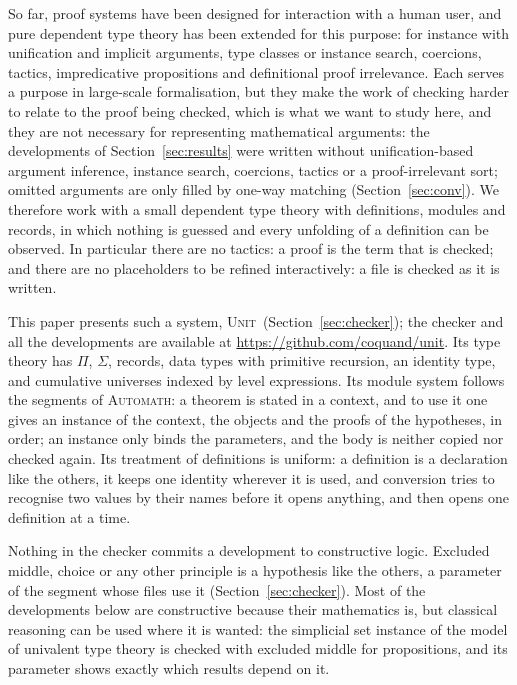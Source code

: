 \documentclass[11pt]{article}
\newcommand{\sys}{\textsc{Unit}}
\begin{document}
So far, proof systems have been designed for interaction with a human
user, and pure dependent type theory has been extended for this purpose:
for instance with unification and implicit arguments, type classes
or instance search, coercions, tactics, impredicative propositions and
definitional proof irrelevance. Each serves a purpose in large-scale
formalisation, but they make the work of checking harder to relate to
the proof being checked, which is what we want to study here, and they
are not necessary for representing mathematical arguments: the
developments of Section~\ref{sec:results} were written without
unification-based argument inference, instance search, coercions,
tactics or a proof-irrelevant sort; omitted arguments are only filled by
one-way matching (Section~\ref{sec:conv}). We
therefore work with a small dependent type theory with definitions,
modules and records, in which nothing is guessed and every unfolding of
a definition can be observed. In particular there are no tactics: a proof is the term that is
checked; and there are no placeholders to be refined interactively: a
file is checked as it is written.

This paper presents such a system, \sys\ (Section~\ref{sec:checker});
the checker and all the developments are available at
\url{https://github.com/coquand/unit}.
Its type theory has $\Pi$, $\Sigma$, records, data types with primitive
recursion, an identity type, and cumulative universes indexed by level
expressions. Its module system follows the segments of \textsc{Automath}:
a theorem is stated in a context, and to use it one gives an instance of
the context, the objects and the proofs of the hypotheses, in order; an
instance only binds the parameters, and the body is neither copied nor
checked again. Its treatment of definitions is uniform: a definition is
a declaration like the others, it keeps one identity wherever it is
used, and conversion tries to recognise two values by their names before
it opens anything, and then opens one definition at a time.

Nothing in the checker commits a development to constructive logic.
Excluded middle, choice or any other principle is a hypothesis like the
others, a parameter of the segment whose files use it
(Section~\ref{sec:checker}). Most of the developments below are
constructive because their mathematics is, but classical reasoning can
be used where it is wanted: the simplicial set instance of the model of
univalent type theory is checked with excluded middle for propositions,
and its parameter shows exactly which results depend on it.
\end{document}
